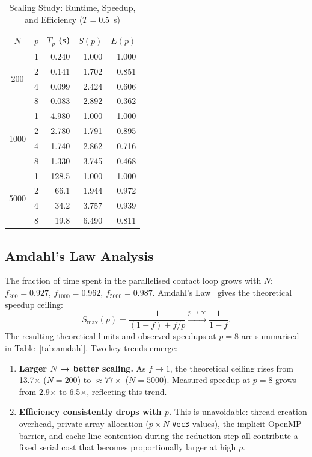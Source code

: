 \documentclass[journal]{IEEEtran}
\begin{document}
\begin{table}[!t]
\renewcommand{\arraystretch}{1.3}
\caption{Scaling Study: Runtime, Speedup, and Efficiency ($T = 0.5$~s)}
\label{tab:scaling}
\centering
\begin{tabular}{c c r r r}
\toprule
$N$ & $p$ & $T_p$ (s) & $S(p)$ & $E(p)$ \\
\midrule
\multirow{4}{*}{200}
 & 1 & 0.240  & 1.000 & 1.000 \\
 & 2 & 0.141  & 1.702 & 0.851 \\
 & 4 & 0.099  & 2.424 & 0.606 \\
 & 8 & 0.083  & 2.892 & 0.362 \\
\midrule
\multirow{4}{*}{1000}
 & 1 & 4.980  & 1.000 & 1.000 \\
 & 2 & 2.780  & 1.791 & 0.895 \\
 & 4 & 1.740  & 2.862 & 0.716 \\
 & 8 & 1.330  & 3.745 & 0.468 \\
\midrule
\multirow{4}{*}{5000}
 & 1 & 128.5  & 1.000 & 1.000 \\
 & 2 & 66.1   & 1.944 & 0.972 \\
 & 4 & 34.2   & 3.757 & 0.939 \\
 & 8 & 19.8   & 6.490 & 0.811 \\
\bottomrule
\end{tabular}
\end{table}

\subsection{Amdahl's Law Analysis}
The fraction of time spent in the parallelised contact loop grows
with $N$: $f_{200} = 0.927$, $f_{1000} = 0.962$, $f_{5000} = 0.987$.
Amdahl's Law~\cite{amdahl1967} gives the theoretical speedup ceiling:
\begin{equation}
  S_{\max}(p) = \frac{1}{(1-f) + f/p}
  \xrightarrow{p\to\infty} \frac{1}{1-f}.
  \label{eq:amdahl}
\end{equation}
The resulting theoretical limits and observed speedups at $p=8$ are
summarised in Table~\ref{tab:amdahl}.  Two key trends emerge:

\begin{enumerate}
\item \textbf{Larger $N$ → better scaling.}  As $f \to 1$, the
theoretical ceiling rises from 13.7$\times$ ($N=200$) to
$\approx 77\times$ ($N=5000$).  Measured speedup at $p=8$ grows from
2.9$\times$ to 6.5$\times$, reflecting this trend.

\item \textbf{Efficiency consistently drops with $p$.}  This is
unavoidable: thread-creation overhead, private-array allocation
($p\times N$ \texttt{Vec3} values), the implicit OpenMP barrier, and
cache-line contention during the reduction step all contribute a
fixed serial cost that becomes proportionally larger at high $p$.
\end{enumerate}
\end{document}
